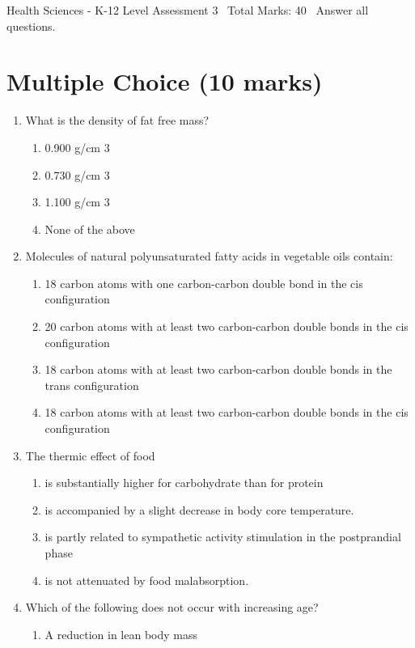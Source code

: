 \documentclass[12pt]{article}
\begin{document}
\begin{center}
Health Sciences - K-12 Level Assessment 3 \
Total Marks: 40 \
Answer all questions.
\end{center}

\section*{Multiple Choice (10 marks)}
\begin{enumerate}[label=\arabic*.]
\item What is the density of fat free mass?
\begin{enumerate}[label=(\alph*)]
    \item 0.900 g/cm 3
    \item 0.730 g/cm 3
    \item 1.100 g/cm 3
    \item None of the above
\end{enumerate}
\item Molecules of natural polyunsaturated fatty acids in vegetable oils contain:
\begin{enumerate}[label=(\alph*)]
    \item 18 carbon atoms with one carbon-carbon double bond in the cis configuration
    \item 20 carbon atoms with at least two carbon-carbon double bonds in the cis configuration
    \item 18 carbon atoms with at least two carbon-carbon double bonds in the trans configuration
    \item 18 carbon atoms with at least two carbon-carbon double bonds in the cis configuration
\end{enumerate}
\item The thermic effect of food
\begin{enumerate}[label=(\alph*)]
    \item is substantially higher for carbohydrate than for protein
    \item is accompanied by a slight decrease in body core temperature.
    \item is partly related to sympathetic activity stimulation in the postprandial phase
    \item is not attenuated by food malabsorption.
\end{enumerate}
\item Which of the following does not occur with increasing age?
\begin{enumerate}[label=(\alph*)]
    \item A reduction in lean body mass

\end{enumerate}
\end{enumerate}
\end{document}
